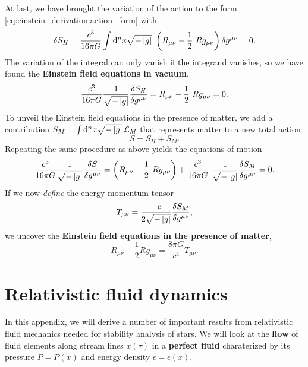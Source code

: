 At last, we have brought the variation of the action to the form \eqref{eq:einstein_derivation:action_form} with
\begin{equation}
	\variation{S_H} = \frac{c^3}{16 \pi G} \int \dif^n x \sqrt{-\det{g}} \left( R_{\mu \nu} - \frac{1}{2} R g_{\mu \nu} \right) \variation{g^{\mu \nu}} = 0 .
\end{equation}
The variation of the integral can only vanish if the integrand vanishes, so we have found the \textbf{Einstein field equations in vacuum},
\begin{equation}
	 \frac{c^3}{16 \pi G} \frac{1}{\sqrt{-\det{g}}} \fdv{S_H}{g^{\mu \nu}} = R_{\mu \nu} - \frac{1}{2} R g_{\mu \nu} = 0 .
	\label{eq:einstein_derivation:einstein_vacuum}
\end{equation}
To unveil the Einstein field equations in the presence of matter, we add a contribution $S_M = \int \mathop{}\!\mathrm{d}^n x \sqrt{-\left\lvert g \right\rvert} \, \mathcal{L}_M$ that represents matter to a new total action
\begin{equation}
	S = S_H + S_M .
\end{equation}
Repeating the same procedure as above yields the equations of motion
\begin{equation}
	\frac{c^3}{16 \pi G} \frac{1}{\sqrt{-\det{g}}} \fdv{S}{g^{\mu \nu}} = \left( R_{\mu \nu} - \frac{1}{2} R g_{\mu \nu} \right) + \frac{c^3}{16 \pi G} \frac{1}{\sqrt{-\det{g}}} \frac{\variation{S_M}}{\variation{g^{\mu \nu}}} = 0 .
\end{equation}
If we now \emph{define} the energy-momentum tensor
\begin{equation}
	T_{\mu \nu} = \frac{-c}{2 \sqrt{-\left\lvert g \right\rvert}} \frac{\delta S_M}{\delta g^{\mu \nu}} ,
\end{equation}
we uncover the \textbf{Einstein field equations in the presence of matter},
\begin{equation}
	R_{\mu \nu} - \frac{1}{2} R g_{\mu \nu} = \frac{8 \pi G}{c^4} T_{\mu \nu} .
	\label{eq:einstein_derivation:einstein_matter}
\end{equation}


\chapter{Relativistic fluid dynamics}
\label{chap:relfluid}

In this appendix, we will derive a number of important results from relativistic fluid mechanics needed for stability analysis of stars.
We will look at the \textbf{flow} of fluid elements along stream lines $x(\tau)$ in a \textbf{perfect fluid} charaterized by its pressure $P = P(x)$ and energy density $\epsilon = \epsilon(x)$.

